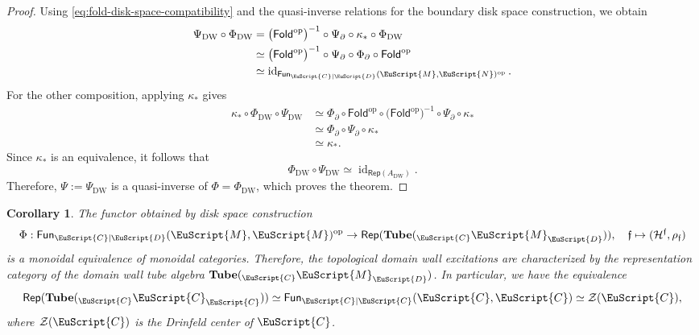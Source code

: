 \documentclass[a4paper,11pt]{article}
\newtheorem{corollary}[theorem]{Corollary}
\theoremstyle{definition}
\theoremstyle{remark}
\newcommand\eC           {\EuScript{C}}
\newcommand\eD           {\EuScript{D}}
\newcommand\eM          {\EuScript{M}}
\newcommand\eN         {\EuScript{N}}
\newcommand{\Rep}{\mathsf{Rep}}
\newcommand{\id}{\operatorname{id}}
\newcommand{\Tube}{\mathbf{Tube}}
\newcommand{\Fun}{\mathsf{Fun}}
\begin{document}
\begin{proof}
Using \eqref{eq:fold-disk-space-compatibility} and the quasi-inverse relations for the boundary disk space construction, we obtain
\begin{equation*}
    \begin{aligned}
        \Psi_{\mathrm{DW}}\circ\Phi_{\mathrm{DW}} &= \bigl(\mathsf{Fold}^{\mathrm{op}}\bigr)^{-1} \circ\Psi_{\partial}\circ\kappa_* \circ\Phi_{\mathrm{DW}}  \\
        &\simeq \bigl(\mathsf{Fold}^{\mathrm{op}}\bigr)^{-1} \circ\Psi_{\partial}\circ\Phi_{\partial} \circ\mathsf{Fold}^{\mathrm{op}} \\
        &\simeq  \id_{\Fun_{\eC|\eD}(\eM,\eN)^{\mathrm{op}}}.
    \end{aligned}
\end{equation*}
For the other composition, applying $\kappa_*$ gives
\begin{equation*}
    \begin{aligned}
        \kappa_*\circ\Phi_{\mathrm{DW}}\circ\Psi_{\mathrm{DW}}
        &\simeq \Phi_{\partial}\circ\mathsf{Fold}^{\mathrm{op}} \circ \bigl(\mathsf{Fold}^{\mathrm{op}}\bigr)^{-1}\circ\Psi_{\partial}\circ\kappa_* \\
        &\simeq \Phi_{\partial}\circ\Psi_{\partial}\circ\kappa_*\\
        &\simeq \kappa_*.
    \end{aligned}
\end{equation*}
Since $\kappa_*$ is an equivalence, it follows that
\begin{equation*}
    \Phi_{\mathrm{DW}}\circ\Psi_{\mathrm{DW}} \simeq \id_{\Rep(A_{\mathrm{DW}})}.
\end{equation*}
Therefore, $\Psi:=\Psi_{\mathrm{DW}}$ is a quasi-inverse of
$\Phi=\Phi_{\mathrm{DW}}$, which proves the theorem.
\end{proof}


\begin{corollary}
    The functor obtained by disk space construction  
    \begin{equation}
        \Phi:\Fun_{\eC|\eD}(\eM,\eM)^{\rm op} \to \Rep(\Tube({}_\eC\eM_\eD)),\quad \mathfrak{f}\mapsto (\mathcal{H}^\mathfrak{f},\rho_\mathfrak{f}) 
    \end{equation}
    is a monoidal equivalence of monoidal categories. Therefore, the topological domain wall excitations are characterized by the representation category of the domain wall tube algebra $\Tube({}_\eC\eM_\eD)$. In particular, we have the equivalence 
    \begin{equation}
        \Rep(\Tube({}_\eC\eC_\eC)) \simeq \Fun_{\eC|\eC}(\eC,\eC) \simeq \mathcal{Z}(\eC),
    \end{equation}
    where $\mathcal{Z}(\eC)$ is the Drinfeld center of $\eC$. 
\end{corollary}
\end{document}
